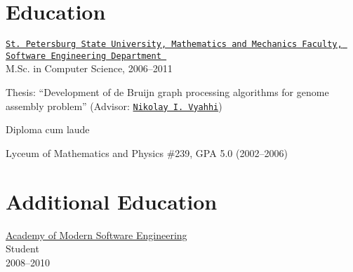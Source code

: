 \section{Education}
%
%

\href{http://www.math.spbu.ru/en/index.html}{\tt St.~Petersburg State University, Mathematics and Mechanics Faculty, Software Engineering Department 
}\\
  M.Sc. in Computer Science, 2006--2011 %
\begin{innerlist}
  \item Thesis: ``Development of de Bruijn graph processing algorithms
        for genome assembly problem'' (Advisor: \href{http://spbsu.ru/vyahhi/}{\tt Nikolay I.~Vyahhi})
  \item Diploma cum laude
\end{innerlist}

\blankline

Lyceum of Mathematics and Physics \#239, GPA 5.0 (2002--2006)

\section{Additional Education}
\href{http://www.amse.ru/}{Academy of Modern Software Engineering}\\
      Student\\
      2008--2010

\blankline




